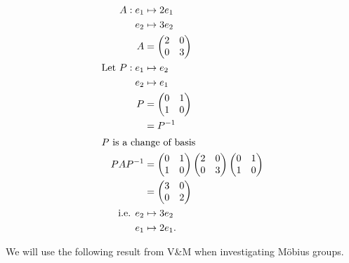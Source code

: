 \begin{example} ~\vspace*{-1.5\baselineskip}
    \begin{align*}
        A : e_1 &\mapsto 2 e_1 \\
        e_2 &\mapsto 3e_2 \\
        A &= \begin{pmatrix}
        2 & 0 \\
        0 & 3
        \end{pmatrix} \\
        \text{Let } P : e_1 &\mapsto e_2 \\
        e_2 &\mapsto e_1 \\
        P &= \begin{pmatrix}
        0 & 1 \\
        1 & 0
        \end{pmatrix} \\
        &= P^{-1} \\
        \intertext{$P$ is a change of basis}
        PAP^{-1} &= \begin{pmatrix}
            0 & 1 \\
            1 & 0
            \end{pmatrix} \begin{pmatrix}
                2 & 0 \\
                0 & 3
                \end{pmatrix} \begin{pmatrix}
                0 & 1 \\
                1 & 0
                \end{pmatrix} \\
            &= \begin{pmatrix}
            3 & 0 \\
            0 & 2
            \end{pmatrix} \\
        \text{i.e. } e_2 &\mapsto 3e_2 \\
        e_1 &\mapsto 2 e_1.
    \end{align*}
\end{example} 

We will use the following result from V\&M when investigating M\"obius groups.


